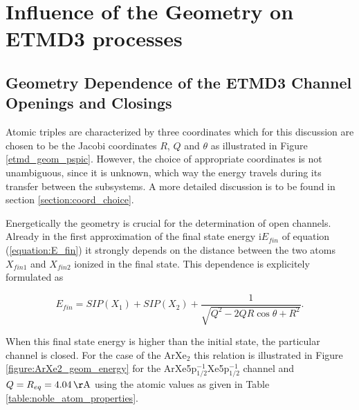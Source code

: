 \section{Influence of the Geometry on ETMD3 processes}
\subsection{Geometry Dependence of the ETMD3 Channel Openings and Closings}
Atomic triples are characterized by three coordinates which for this
discussion are chosen to be the Jacobi coordinates
$R$, $Q$ and $\theta$ as illustrated
in Figure \ref{etmd_geom_pspic}.
However, the choice of appropriate coordinates is not unambiguous,
since it is unknown, which way the energy travels during its transfer
between the subsystems. A more detailed discussion is to be found in 
section \ref{section:coord_choice}.


Energetically the geometry is crucial for the determination of open channels.
Already in the first approximation of the final state energy i$E_{fin}$ of equation
(\ref{equation:E_fin}) it
strongly depends on the distance between the
two atoms $X_{fin1}$ and $X_{fin2}$ ionized in the final state.
This dependence is explicitely formulated as

\begin{equation}
  E_{fin} = SIP(X_1) + SIP(X_2) + \frac{1}{\sqrt{Q^2 - 2QR\cos\theta + R^2}} .
\end{equation}

When this final state energy is higher than the initial state, the particular
channel is closed. For the case of the ArXe$_2$ this relation is illustrated
in Figure \ref{figure:ArXe2_geom_energy} for the
ArXe5p$_{1/2}^{-1}$Xe5p$_{1/2}^{-1}$ channel and $Q=R_{eq}= \unit[4.04]{\AA}$
using the atomic values as given in Table \ref{table:noble_atom_properties}.

